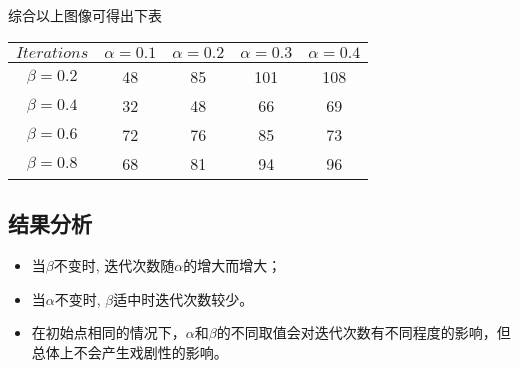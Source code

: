 \documentclass[12pt,a4paper,UTF-8]{article}
\begin{document}
\subparagraph{}综合以上图像可得出下表

\begin{table}[!hbp]
	\centering\begin{tabular}{|c|c|c|c|c|}
		\hline
		$Iterations$ & $\alpha=0.1$ & $\alpha=0.2$ & $\alpha=0.3$ & $\alpha=0.4$ \\
		\hline
		$\beta=0.2$ & 48 & 85 & 101 & 108 \\
		\hline
		$\beta=0.4$ & 32 & 48 & 66 & 69 \\
		\hline
		$\beta=0.6$ & 72 & 76 & 85 & 73 \\
		\hline
		$\beta=0.8$ & 68 & 81 & 94 & 96 \\
		\hline
	\end{tabular}
\end{table}  


\subsection{结果分析}

\begin{itemize}

	\item 当$\beta$不变时, 迭代次数随$\alpha$的增大而增大；

	\item 当$\alpha$不变时, $\beta$适中时迭代次数较少。
	\item 在初始点相同的情况下，$\alpha$和$\beta$的不同取值会对迭代次数有不同程度的影响，但总体上不会产生戏剧性的影响。
	

\end{itemize}
\end{document}
